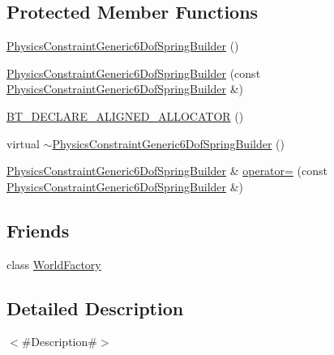 \subsection*{Protected Member Functions}
\begin{DoxyCompactItemize}
\item 
\mbox{\hyperlink{classnjli_1_1_physics_constraint_generic6_dof_spring_builder_a96e7fd9eab29846c27862aadd2c244b0}{Physics\+Constraint\+Generic6\+Dof\+Spring\+Builder}} ()
\item 
\mbox{\hyperlink{classnjli_1_1_physics_constraint_generic6_dof_spring_builder_a0d7ee2c28da321f0eb592911ae6a4e01}{Physics\+Constraint\+Generic6\+Dof\+Spring\+Builder}} (const \mbox{\hyperlink{classnjli_1_1_physics_constraint_generic6_dof_spring_builder}{Physics\+Constraint\+Generic6\+Dof\+Spring\+Builder}} \&)
\item 
\mbox{\hyperlink{classnjli_1_1_physics_constraint_generic6_dof_spring_builder_ae304eb3d0766c52d3d4896faa6865567}{B\+T\+\_\+\+D\+E\+C\+L\+A\+R\+E\+\_\+\+A\+L\+I\+G\+N\+E\+D\+\_\+\+A\+L\+L\+O\+C\+A\+T\+OR}} ()
\item 
virtual \mbox{\hyperlink{classnjli_1_1_physics_constraint_generic6_dof_spring_builder_a98e6112cbfbba4cd17395630514d0469}{$\sim$\+Physics\+Constraint\+Generic6\+Dof\+Spring\+Builder}} ()
\item 
\mbox{\hyperlink{classnjli_1_1_physics_constraint_generic6_dof_spring_builder}{Physics\+Constraint\+Generic6\+Dof\+Spring\+Builder}} \& \mbox{\hyperlink{classnjli_1_1_physics_constraint_generic6_dof_spring_builder_a0a2ee57a64c09b4909393de031a1bda0}{operator=}} (const \mbox{\hyperlink{classnjli_1_1_physics_constraint_generic6_dof_spring_builder}{Physics\+Constraint\+Generic6\+Dof\+Spring\+Builder}} \&)
\end{DoxyCompactItemize}
\subsection*{Friends}
\begin{DoxyCompactItemize}
\item 
class \mbox{\hyperlink{classnjli_1_1_physics_constraint_generic6_dof_spring_builder_acb96ebb09abe8f2a37a915a842babfac}{World\+Factory}}
\end{DoxyCompactItemize}


\subsection{Detailed Description}
$<$\#\+Description\#$>$ 

